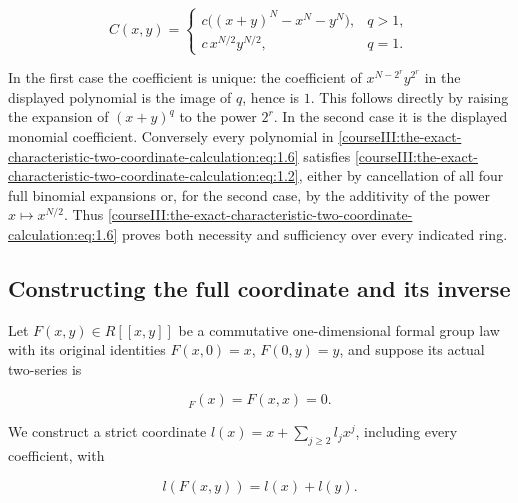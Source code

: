 \begin{equation}
C(x,y)=
 \begin{cases}
 c\bigl((x+y)^N-x^N-y^N\bigr),&q>1,\\
 c\,x^{N/2}y^{N/2},&q=1.
 \end{cases}
 \label{courseIII:the-exact-characteristic-two-coordinate-calculation:eq:1.6}
\end{equation}

In the first case the coefficient is unique: the coefficient of \(x^{N-2^r}y^{2^r}\) in the displayed polynomial is the image of \(q\), hence is \(1\). This follows directly by raising the expansion of \((x+y)^q\) to the power \(2^r\). In the second case it is the displayed monomial coefficient. Conversely every polynomial in \eqref{courseIII:the-exact-characteristic-two-coordinate-calculation:eq:1.6} satisfies \eqref{courseIII:the-exact-characteristic-two-coordinate-calculation:eq:1.2}, either by cancellation of all four full binomial expansions or, for the second case, by the additivity of the power \(x\mapsto x^{N/2}\). Thus \eqref{courseIII:the-exact-characteristic-two-coordinate-calculation:eq:1.6} proves both necessity and sufficiency over every indicated ring.

\subsection{Constructing the full coordinate and its inverse}
\label{courseIII:the-exact-characteristic-two-coordinate-calculation:formal-two-linearization}

\label{courseIII:the-exact-characteristic-two-coordinate-calculation:section-2}\label{courseIII:formal-char2:2}

Let \(F(x,y)\in R[[x,y]]\) be a commutative one-dimensional formal group law with its original identities \(F(x,0)=x\), \(F(0,y)=y\), and suppose its actual two-series is

\begin{equation}
[2]_F(x)=F(x,x)=0.
 \label{courseIII:the-exact-characteristic-two-coordinate-calculation:eq:2.1}
\end{equation}

We construct a strict coordinate \(l(x)=x+\sum_{j\geq2}l_jx^j\), including every coefficient, with

\begin{equation}
l(F(x,y))=l(x)+l(y).
 \label{courseIII:the-exact-characteristic-two-coordinate-calculation:eq:2.2}
\end{equation}

